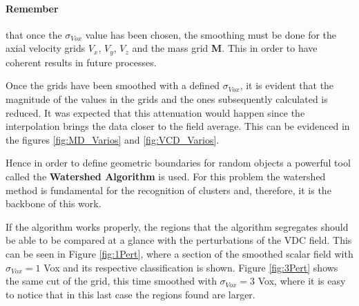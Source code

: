\documentclass[a4paper,fleqn,usenatbib]{mnras}
\begin{document}


\paragraph{Remember}  that once the $\sigma_{Vox}$ value has been chosen, the smoothing must be done for the axial velocity grids $V_x$, $V_y$, $V_z$ and the mass grid \textbf{M}. This in order to have coherent results in future processes.




Once the grids have been smoothed with a defined $\sigma_{Vox}$, it is evident that the magnitude of the values in the grids and the ones subsequently calculated is reduced. It was expected that this attenuation would happen since the interpolation brings the data closer to the field average. This can be evidenced in the figures \ref{fig:MD_Varios} and \ref{fig:VCD_Varios}.


 Hence in order to define geometric boundaries for random objects a powerful tool called  the \textbf{Watershed Algorithm} is used. For this problem the watershed method is fundamental for the recognition of clusters and, therefore, it is the backbone of this work.
 
 If the algorithm works properly, the regions that the algorithm segregates should be able to be compared at a glance with the perturbations of the VDC field. This can be seen in Figure \ref{fig:1Pert}, where a section of the smoothed scalar field with $\sigma_{Vox} = 1$ Vox and its respective classification is shown. Figure \ref{fig:3Pert} shows the same cut of the grid, this time smoothed with $\sigma_{Vox} = 3$ Vox, where it is easy to notice that in this last case the regions found are larger.

\end{document}
